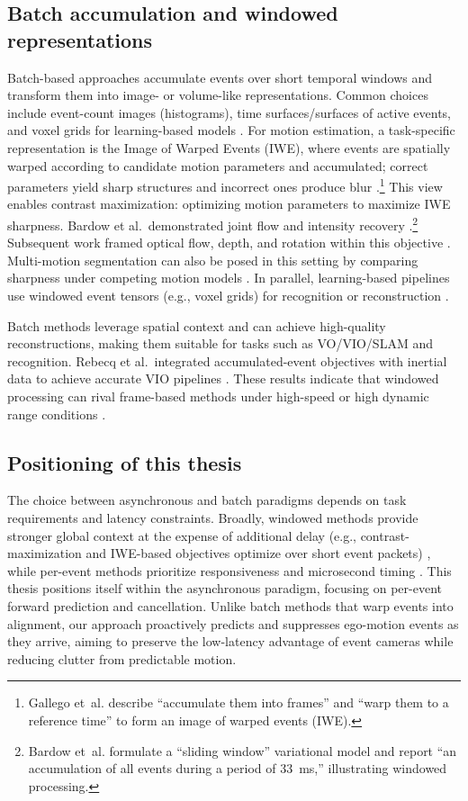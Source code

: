 \subsection{Batch accumulation and windowed representations}
Batch-based approaches accumulate events over short temporal windows and transform them into image- or volume-like representations. Common choices include event-count images (histograms), time surfaces/surfaces of active events, and voxel grids for learning-based models \cite{Gallego2020Survey}. For motion estimation, a task-specific representation is the Image of Warped Events (IWE), where events are spatially warped according to candidate motion parameters and accumulated; correct parameters yield sharp structures and incorrect ones produce blur \cite{Gallego2018CMax}.\footnote{Gallego et~al. describe “accumulate them into frames” and “warp them to a reference time” to form an image of warped events (IWE).} This view enables contrast maximization: optimizing motion parameters to maximize IWE sharpness. Bardow et al.\ demonstrated joint flow and intensity recovery \cite{Bardow2016SOFIE}.\footnote{Bardow et~al. formulate a “sliding window” variational model and report “an accumulation of all events during a period of 33~ms,” illustrating windowed processing.} Subsequent work framed optical flow, depth, and rotation within this objective \cite{Gallego2018CMax}. Multi-motion segmentation can also be posed in this setting by comparing sharpness under competing motion models \cite{Stoffregen2019Segmentation}. In parallel, learning-based pipelines use windowed event tensors (e.g., voxel grids) for recognition or reconstruction \cite{Rebecq2019E2VID,Gallego2020Survey}.

Batch methods leverage spatial context and can achieve high-quality reconstructions, making them suitable for tasks such as VO/VIO/SLAM and recognition. Rebecq et al.\ integrated accumulated-event objectives with inertial data to achieve accurate VIO pipelines \cite{Rebecq2017EVO,Rebecq2019E2VID}. These results indicate that windowed processing can rival frame-based methods under high-speed or high dynamic range conditions \cite{Gallego2020Survey}.

\subsection{Positioning of this thesis}
The choice between asynchronous and batch paradigms depends on task requirements and latency constraints. Broadly, windowed methods provide stronger global context at the expense of additional delay (e.g., contrast-maximization and IWE-based objectives optimize over short event packets) \cite{Gallego2018CMax,Bardow2016SOFIE,Stoffregen2019Segmentation,Rebecq2017EVO,Rebecq2019E2VID}, while per-event methods prioritize responsiveness and microsecond timing \cite{Gallego2020Survey}. This thesis positions itself within the asynchronous paradigm, focusing on per-event forward prediction and cancellation. Unlike batch methods that warp events into alignment, our approach proactively predicts and suppresses ego-motion events as they arrive, aiming to preserve the low-latency advantage of event cameras while reducing clutter from predictable motion.

